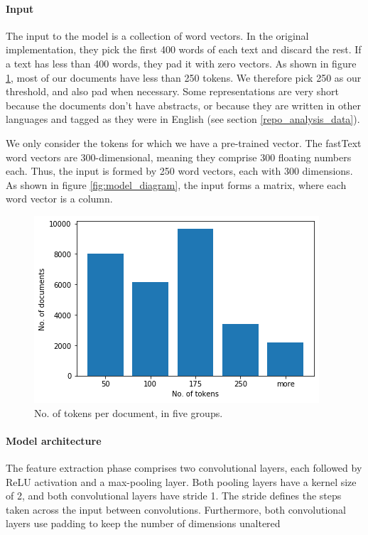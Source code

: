 \paragraph{Input} \mbox{}

The input to the model is a collection of word vectors. In the original implementation, they pick the first 400 words of each text and discard the rest. If a text has less than 400 words, they pad it with zero vectors. As shown in figure \ref{fig:sm_doc_length}, most of our documents have less than 250 tokens. We therefore pick 250 as our threshold, and also pad when necessary. Some representations are very short because the documents don't have abstracts, or because they are written in other languages and tagged as they were in English (see section \ref{repo_analysis_data}).

We only consider the tokens for which we have a pre-trained vector. The fastText word vectors are 300-dimensional, meaning they comprise 300 floating numbers each. Thus, the input is formed by 250 word vectors, each with 300 dimensions. As shown in figure \ref{fig:model_diagram}, the input forms a matrix, where each word vector is a column.

\begin{figure}
    \centering
    \includegraphics[width=.6\textwidth]{figures/supervised_approach/sm_doc_length.png}
    \caption{No. of tokens per document, in five groups.}
    \label{fig:sm_doc_length}
\end{figure}

\paragraph{Model architecture} \mbox{}

The feature extraction phase comprises two convolutional layers, each followed by ReLU activation and a max-pooling layer. Both pooling layers have a kernel size of 2, and both convolutional layers have stride 1. The stride defines the steps taken across the input between convolutions. Furthermore, both convolutional layers use padding to keep the number of dimensions unaltered

